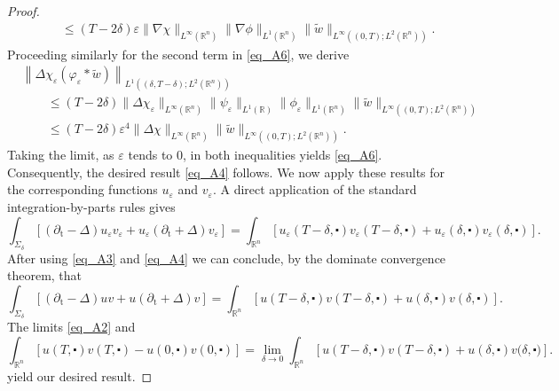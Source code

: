 \documentclass[10pt,a4paper]{amsart}
\theoremstyle{remark}
\theoremstyle{definition}
\begin{document}
\begin{proof}
\begin{align*}
 &\qquad \leq (T-2 \delta) \varepsilon \|  \nabla \chi \|_{L^\infty\left(\mathbb{R}^n\right)}  \|  \nabla \phi \|_{L^1\left(\mathbb{R}^n\right)} \|  \tilde{w} \|_{L^\infty\left((0, T) ; L^2\left(\mathbb{R}^n\right)\right)}.
\end{align*}
Proceeding similarly for the second term in \eqref{eq_A6}, we derive
\begin{align*}
& \left\|\Delta \chi_{\varepsilon} \left(\varphi_{\varepsilon} \ast \tilde{w}\right)\right\|_{L^1\left((\delta, T-\delta) ; L^2\left(\mathbb{R}^n\right)\right)} \\
  &\qquad \leq (T-2 \delta) \|  \Delta \chi_{\varepsilon} \|_{L^\infty\left(\mathbb{R}^n\right)} \|  \psi_{\varepsilon} \|_{L^1\left(\mathbb{R}\right)} \| \phi_{\varepsilon} \|_{L^1\left(\mathbb{R}^n\right)} \|  \tilde{w} \|_{L^\infty\left((0, T) ; L^2\left(\mathbb{R}^n\right)\right)}\\
 &\qquad \leq (T-2 \delta) {\varepsilon}^4\|  \Delta \chi \|_{L^\infty\left(\mathbb{R}^n\right)} \|  \tilde{w} \|_{L^\infty\left((0, T) ; L^2\left(\mathbb{R}^n\right)\right)}.
\end{align*}
Taking the limit, as $\varepsilon $ tends to $ 0$, in both inequalities yields \eqref{eq_A6}. Consequently, the desired result \eqref{eq_A4} follows. We now apply these results for the corresponding functions $u_{\varepsilon}$ and $v_{\varepsilon}$. A direct application of the standard integration-by-parts rules gives
\[ \int_{\Sigma_\delta}[( \partial_{\mathrm{t}}-\Delta) u_{\varepsilon}{v_{\varepsilon}}+u_{\varepsilon} ( \partial_{\mathrm{t}}+\Delta) v_{\varepsilon}]= \int_{\mathbb{R}^n}[u_{\varepsilon}(T-\delta,\centerdot) {v_{\varepsilon}(T-\delta, \centerdot)}+u_{\varepsilon}(\delta, \centerdot) {v_{\varepsilon}(\delta, \centerdot)}] . \]
After using \eqref{eq_A3} and \eqref{eq_A4} we can conclude, by the dominate convergence theorem, that
$$
\int_{\Sigma_\delta}\left[\left( \partial_{\mathrm{t}}-\Delta\right) u v+u {\left( \partial_{\mathrm{t}}+\Delta\right) v}\right]= \int_{\mathbb{R}^n}\left[u(T-\delta, \centerdot) {v\left(T-\delta{, \centerdot}\right)}+u(\delta, \centerdot) {v(\delta, \centerdot)}\right] .
$$
The limits \eqref{eq_A2} and
$$
\int_{\mathbb{R}^n}[u(T, \centerdot) {v(T, \centerdot)}-u(0, \centerdot) {v(0, \centerdot)}]=\lim _{\delta \rightarrow 0} \int_{\mathbb{R}^n}[u(T-\delta, \centerdot) {v(T-\delta, \centerdot)}+u(\delta, \centerdot) {v(\delta, \centerdot})].
$$
yield our desired result.
\end{proof}
\end{document}

